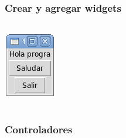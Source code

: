 \documentclass[12pt]{beamer}
\begin{document}
  \begin{frame}
    \label{crear-widgets}
    \frametitle{Crear y agregar widgets}
    \begin{columns}[B]
        \footnotesize
        
        \vfill
        \includegraphics[width=\textwidth]{programas/tkinter/capturas/04.png}
    \end{columns}
  \end{frame}

  \begin{frame}
    \label{controladores}
    \frametitle{Controladores}
    \footnotesize
    
  \end{frame}
\end{document}
